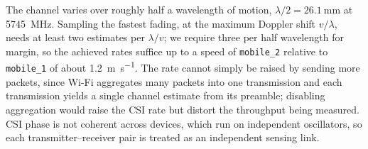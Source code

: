 The channel varies over roughly half a wavelength of motion,
$\lambda/2 = \SI{26.1}{\milli\metre}$ at \SI{5745}{\mega\hertz}. Sampling the
fastest fading, at the maximum Doppler shift $v/\lambda$, needs at
least two estimates per $\lambda/v$; we require three per half
wavelength for margin, so the achieved rates suffice up to a speed of
\texttt{mobile\_2} relative to \texttt{mobile\_1} of about
\SI{1.2}{\metre\per\second}. The rate cannot simply be raised by sending more
packets, since Wi-Fi aggregates many packets into one transmission and
each transmission yields a single channel estimate from its preamble;
disabling aggregation would raise the CSI rate but distort the
throughput being measured. CSI phase is not coherent across devices,
which run on independent oscillators, so each transmitter--receiver
pair is treated as an independent sensing link.


